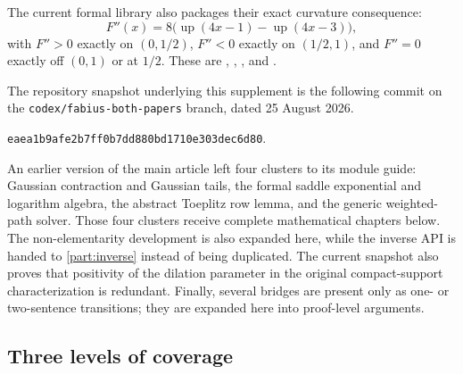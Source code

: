 \documentclass[11pt,oneside]{article}
\theoremstyle{definition}
\theoremstyle{remark}
\newcommand{\Up}{\operatorname{up}}
\begin{document}
The current formal library also packages their exact curvature consequence:
\begin{equation}
 F''(x)=8\bigl(\Up(4x-1)-\Up(4x-3)\bigr),
 \label{integration:eq:forward-second-derivative}
\end{equation}
with \(F''>0\) exactly on \((0,1/2)\), \(F''<0\) exactly on \((1/2,1)\), and
\(F''=0\) exactly off \((0,1)\) or at \(1/2\).  These are
, ,
, and
.

The repository snapshot underlying this supplement is the following commit on
the \texttt{codex/fabius-both-papers} branch, dated 25 August 2026.
\begin{center}
 \texttt{eaea1b9afe2b7ff0b7dd880bd1710e303dec6d80}.
\end{center}
An earlier version of the main article left four clusters to its module guide:
Gaussian contraction and Gaussian tails, the formal saddle exponential and
logarithm algebra, the abstract Toeplitz row lemma, and the generic weighted-path solver.
Those four clusters receive complete mathematical chapters below.  The non-elementarity
development is also expanded here, while the inverse API is handed to \cref{part:inverse}
instead of being duplicated.  The current snapshot also proves that positivity of the
dilation parameter in the original compact-support characterization is redundant.  Finally,
several bridges are present only as one- or two-sentence transitions; they are expanded here
into proof-level arguments.

\subsection{Three levels of coverage}
\end{document}
